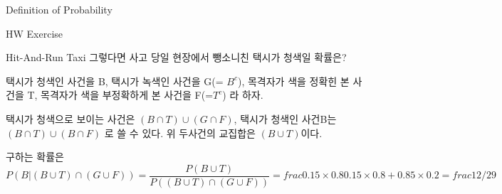 \begin{edXchapter}{Definition of Probability}
\begin{edXsection}{HW Exercise}
\begin{edXvertical}
\begin{edXproblem}{Hit-And-Run Taxi}
그렇다면 사고 당일 현장에서 뺑소니친 택시가 청색일 확률은?
\begin{edXsolution}
택시가 청색인 사건을 B, 택시가 녹색인 사건을 G(= $B^c$),
목격자가 색을 정확힌 본 사건을 T, 목격자가 색을 부정확하게 본 사건을 F(=$T^c$)
라 하자.

택시가 청색으로 보이는 사건은 $(B \cap T) \cup (G \cap F)$,
택시가 청색인 사건B는  $(B \cap T) \cup (B \cap F)$ 로 쓸 수 있다.
위 두사건의 교집합은 $(B \cup T)$이다.

구하는 확률은 
\begin{equation}
P(B |{(B \cup T) \cap (G \cup F)}) = \frac{P(B \cup T)}{P((B \cup T) \cap (G \cup F))} = frac{0.15 \times 0.8}{0.15 \times 0.8 + 0.85 \times 0.2} = frac{12/29}
\end{equation}
\end{edXsolution}
\end{edXproblem}

\end{edXvertical}
\end{edXsection}
\end{edXchapter}









